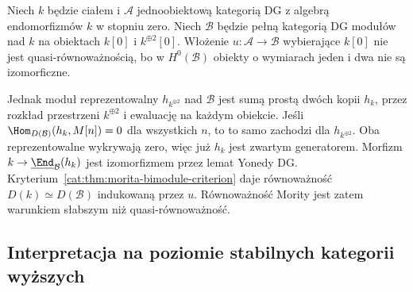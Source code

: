 \begin{przyklad}\label{cat:ex:morita-not-quasi-equivalence}
Niech $k$ będzie ciałem i $\mathcal A$ jednoobiektową kategorią DG z algebrą endomorfizmów $k$ w stopniu zero. Niech $\mathcal B$ będzie pełną kategorią DG modułów nad $k$ na obiektach $k[0]$ i $k^{\oplus2}[0]$. Włożenie $u:\mathcal A\to\mathcal B$ wybierające $k[0]$ nie jest quasi-równoważnością, bo w $H^0(\mathcal B)$ obiekty o wymiarach jeden i dwa nie są izomorficzne.

Jednak moduł reprezentowalny $h_{k^{\oplus2}}$ nad $\mathcal B$ jest sumą prostą dwóch kopii $h_k$, przez rozkład przestrzeni $k^{\oplus2}$ i ewaluację na każdym obiekcie. Jeśli $\Hom_{D(\mathcal B)}(h_k,M[n])=0$ dla wszystkich $n$, to to samo zachodzi dla $h_{k^{\oplus2}}$. Oba reprezentowalne wykrywają zero, więc już $h_k$ jest zwartym generatorem. Morfizm $k\to\underline{\End}_{\mathcal B}(h_k)$ jest izomorfizmem przez lemat Yonedy DG. Kryterium~\ref{cat:thm:morita-bimodule-criterion} daje równoważność $D(k)\simeq D(\mathcal B)$ indukowaną przez $u$. Równoważność Mority jest zatem warunkiem słabszym niż quasi-równoważność.
\end{przyklad}

\subsection{Interpretacja na poziomie stabilnych kategorii wyższych}

